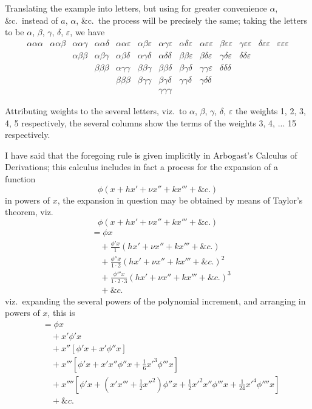 \documentclass[11pt,a4paper]{book}
\begin{document}
Translating the example into letters, but using for greater convenience $\alpha$, \&c.\
instead of $a$, $\alpha$, \&c.\ the process will be precisely the same; taking the letters to be
$\alpha$, $\beta$, $\gamma$, $\delta$, $\varepsilon$, we have
\[
\begin{array}{ccccccccccccc}
\alpha\alpha\alpha & \alpha\alpha\beta & \alpha\alpha\gamma & \alpha\alpha\delta & \alpha\alpha\varepsilon & \alpha\beta\varepsilon & \alpha\gamma\varepsilon & \alpha\delta\varepsilon & \alpha\varepsilon\varepsilon & \beta\varepsilon\varepsilon & \gamma\varepsilon\varepsilon & \delta\varepsilon\varepsilon & \varepsilon\varepsilon\varepsilon \\
& & \alpha\beta\beta & \alpha\beta\gamma & \alpha\beta\delta & \alpha\gamma\delta & \alpha\delta\delta & \beta\beta\varepsilon & \beta\delta\varepsilon & \gamma\delta\varepsilon & \delta\delta\varepsilon & & \\
& & & \beta\beta\beta & \alpha\gamma\gamma & \beta\beta\gamma & \beta\beta\delta & \beta\gamma\delta & \gamma\gamma\varepsilon & \delta\delta\delta & & & \\
& & & & \beta\beta\beta & \beta\gamma\gamma & \beta\gamma\delta & \gamma\gamma\delta & \gamma\delta\delta & & & & \\
& & & & & & \gamma\gamma\gamma & & & & & &
\end{array}
\]

Attributing weights to the several letters, viz.\ to $\alpha$, $\beta$, $\gamma$, $\delta$, $\varepsilon$ the weights 1, 2, 3, 4, 5
respectively, the several columns show the terms of the weights 3, 4, ... 15 respectively.

I have said that the foregoing rule is given implicitly in Arbogast's Calculus of
Derivations; this calculus includes in fact a process for the expansion of a function
\[
\phi(x+hx'+\nu x''+kx'''+\&c.)
\]
in powers of $x$, the expansion in question may be obtained by means of Taylor's
theorem, viz.
\[
\phi(x+hx'+\nu x''+kx'''+\&c.)
\]
\begin{align*}
&= \phi x \\
&\quad +\frac{\phi'x}{1}(hx'+\nu x''+kx'''+\&c.) \\
&\quad +\frac{\phi''x}{1\cdot2}(hx'+\nu x''+kx'''+\&c.)^2 \\
&\quad +\frac{\phi'''x}{1\cdot2\cdot3}(hx'+\nu x''+kx'''+\&c.)^3 \\
&\quad +\&c.
\end{align*}
viz.\ expanding the several powers of the polynomial increment, and arranging in powers
of $x$, this is
\begin{align*}
&= \phi x \\
&\quad + x'\phi'x \\
&\quad + x''\left[\phi'x + x'\phi''x\right] \\
&\quad + x'''\left[\phi'x + x'x''\phi''x + \frac{1}{6}x'^3\phi'''x\right] \\
&\quad + x''''\left[\phi'x + (x'x''' + \tfrac{1}{2}x''^2)\phi''x + \tfrac{1}{2}x'^2x''\phi'''x + \tfrac{1}{24}x'^4\phi''''x\right] \\
&\quad +\&c.
\end{align*}
\end{document}
